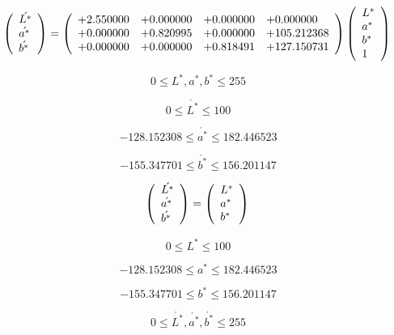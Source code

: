\documentclass{article}
\begin{document}
\[ \left( \begin{array}{l} \acute{L^{*}} \\ \acute{a^{*}} \\ \acute{b^{*}} \\ \end{array} \right) = \left( \begin{array}{llll} +2.550000 & +0.000000 & +0.000000 & +0.000000 \\ +0.000000 & +0.820995 & +0.000000 & +105.212368 \\ +0.000000 & +0.000000 & +0.818491 & +127.150731 \\ \end{array} \right) \left( \begin{array}{l} L^{*} \\ a^{*} \\ b^{*} \\ 1 \\ \end{array} \right) \\ \]
\pagebreak

\[ 0 \le L^{*},a^{*},b^{*} \le 255 \]
\pagebreak

\[ 0 \le \acute{L^{*}} \le 100 \]
\pagebreak

\[ -128.152308 \le \acute{a^{*}} \le 182.446523 \]
\pagebreak

\[ -155.347701 \le \acute{b^{*}} \le 156.201147 \]
\pagebreak

\[ \left( \begin{array}{l} \acute{L^{*}} \\ \acute{a^{*}} \\ \acute{b^{*}} \\ \end{array} \right) = \left( \begin{array}{l} L^{*} \\ a^{*} \\ b^{*} \\ \end{array} \right) \\ \]
\pagebreak

\[ 0 \le L^{*} \le 100 \]
\pagebreak

\[ -128.152308 \le a^{*} \le 182.446523 \]
\pagebreak

\[ -155.347701 \le b^{*} \le 156.201147 \]
\pagebreak

\[ 0 \le \acute{L^{*}},\acute{a^{*}},\acute{b^{*}} \le 255 \]
\pagebreak
\end{document}
